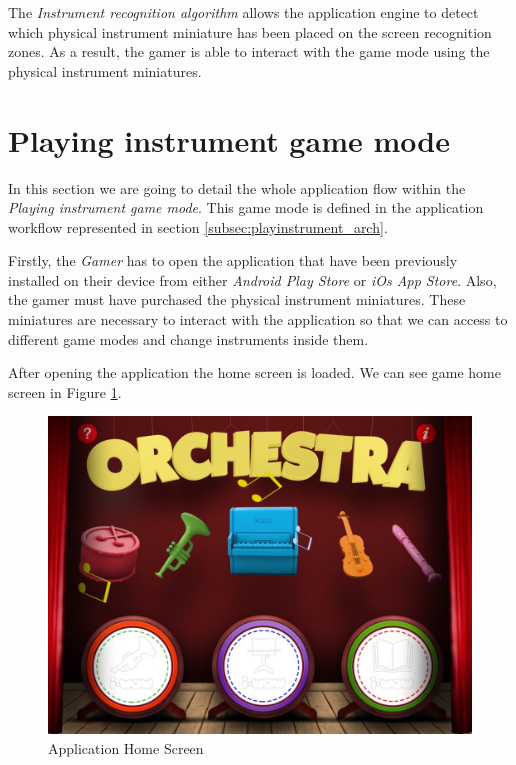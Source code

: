 The \textit{Instrument recognition algorithm} allows the application engine to detect which physical instrument miniature has been placed on the screen recognition zones. As a result, the gamer is able to interact with the game mode using the physical instrument miniatures.

\newpage
\section{Playing instrument game mode}
\label{sec:playinginstrumentgm}

In this section we are going to detail the whole application flow within the \textit{Playing instrument game mode}. This game mode is defined in the application workflow represented in section \ref{subsec:playinstrument_arch}.

Firstly, the \textit{Gamer} has to open the application that have been previously installed on their device from either \textit{Android Play Store} or \textit{iOs App Store}. Also, the gamer must have purchased the physical instrument miniatures. These miniatures are necessary to interact with the application so that we can access to different game modes and change instruments inside them.

After opening the application the home screen is loaded. We can see game home screen in Figure \ref{fig:home_screen}.

\begin{figure}[ht!]
	\centering
	\includegraphics[width=400pt]{graphics/use-case/home_screen.jpg}
	\caption{Application Home Screen}
	\label{fig:home_screen}
\end{figure}

